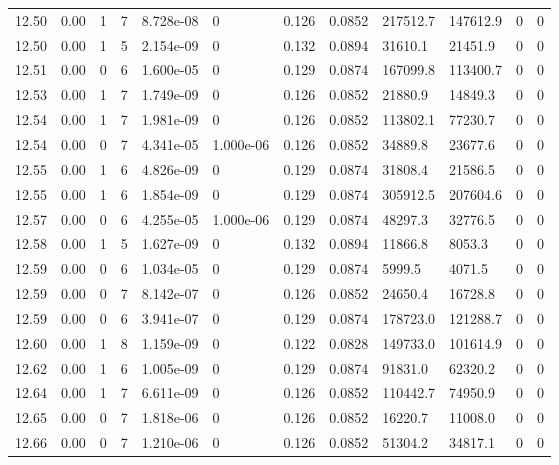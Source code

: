 \documentclass[preview]{standalone}
\begin{document}
{{{{{{{{{{{{{{{\begin{tabular}{L{1.2cm}C{1.2cm} C{0.3cm}C{0.5cm} C{1.4cm}C{1.4cm} C{1.4cm}C{1.4cm} C{1.6cm}C{1.6cm} C{1.6cm}C{1.6cm}}
  12.50  &  0.00  & 1     &  7 &  8.728e-08  & 0  &  0.126&   0.0852& 217512.7 & 147612.9   &  0 & 0  \\ 
  12.50  &  0.00  & 1     &  5 &  2.154e-09  & 0  &  0.132&   0.0894& 31610.1 & 21451.9   &  0 & 0  \\ 
  12.51  &  0.00  & 0     &  6 &  1.600e-05  & 0  &  0.129&   0.0874& 167099.8 & 113400.7   &  0 & 0  \\ 
  12.53  &  0.00  & 1     &  7 &  1.749e-09  & 0  &  0.126&   0.0852& 21880.9 & 14849.3   &  0 & 0  \\ 
  12.54  &  0.00  & 1     &  7 &  1.981e-09  & 0  &  0.126&   0.0852& 113802.1 & 77230.7   &  0 & 0  \\ 
  12.54  &  0.00  & 0     &  7 &  4.341e-05  & 1.000e-06  &  0.126&   0.0852& 34889.8 & 23677.6   &  0 & 0  \\ 
  12.55  &  0.00  & 1     &  6 &  4.826e-09  & 0  &  0.129&   0.0874& 31808.4 & 21586.5   &  0 & 0  \\ 
  12.55  &  0.00  & 1     &  6 &  1.854e-09  & 0  &  0.129&   0.0874& 305912.5 & 207604.6   &  0 & 0  \\ 
  12.57  &  0.00  & 0     &  6 &  4.255e-05  & 1.000e-06  &  0.129&   0.0874& 48297.3 & 32776.5   &  0 & 0  \\ 
  12.58  &  0.00  & 1     &  5 &  1.627e-09  & 0  &  0.132&   0.0894& 11866.8 & 8053.3   &  0 & 0  \\ 
  12.59  &  0.00  & 0     &  6 &  1.034e-05  & 0  &  0.129&   0.0874& 5999.5 & 4071.5   &  0 & 0  \\ 
  12.59  &  0.00  & 0     &  7 &  8.142e-07  & 0  &  0.126&   0.0852& 24650.4 & 16728.8   &  0 & 0  \\ 
  12.59  &  0.00  & 0     &  6 &  3.941e-07  & 0  &  0.129&   0.0874& 178723.0 & 121288.7   &  0 & 0  \\ 
  12.60  &  0.00  & 1     &  8 &  1.159e-09  & 0  &  0.122&   0.0828& 149733.0 & 101614.9   &  0 & 0  \\ 
  12.62  &  0.00  & 1     &  6 &  1.005e-09  & 0  &  0.129&   0.0874& 91831.0 & 62320.2   &  0 & 0  \\ 
  12.64  &  0.00  & 1     &  7 &  6.611e-09  & 0  &  0.126&   0.0852& 110442.7 & 74950.9   &  0 & 0  \\ 
  12.65  &  0.00  & 0     &  7 &  1.818e-06  & 0  &  0.126&   0.0852& 16220.7 & 11008.0   &  0 & 0  \\ 
  12.66  &  0.00  & 0     &  7 &  1.210e-06  & 0  &  0.126&   0.0852& 51304.2 & 34817.1   &  0 & 0  \\ 

\end{tabular}}}}}}}}}}}}}}}}
\end{document}
